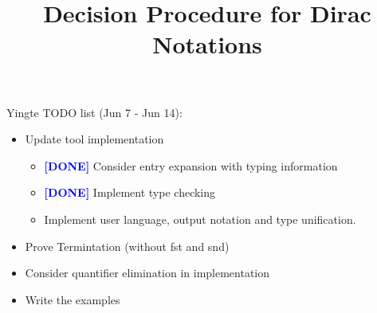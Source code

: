 \documentclass[manuscript, review, timestamp]{acmart}
\newcommand*{\done}{\textcolor{blue}{\textbf{ [DONE] }}}
\begin{document}
\title{Decision Procedure for Dirac Notations}



\begin{abstract}
\end{abstract}



\maketitle

Yingte TODO list (Jun 7 - Jun 14): 
\begin{itemize}
    \item Update tool implementation
    \begin{itemize}
        \item \done Consider entry expansion with typing information
        \item \done Implement type checking
        \item Implement user language, output notation and type unification.
    \end{itemize}
    \item Prove Termintation (without fst and snd)
    \item Consider quantifier elimination in implementation
    \item Write the examples
\end{itemize}
\end{document}
